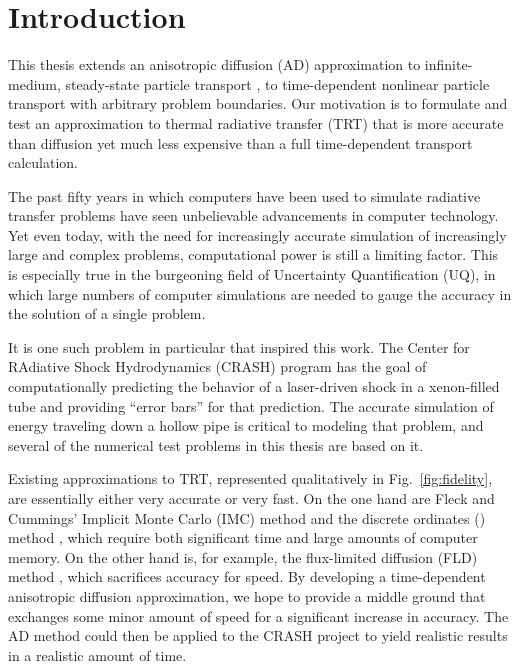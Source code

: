 
\chapter{Introduction}\label{chap:introduction}
This thesis extends an anisotropic diffusion (AD) approximation to
infinite-medium, steady-state particle transport \cite{Mor2007,Lar2009c}, to
time-dependent nonlinear particle transport with arbitrary problem boundaries.
Our motivation is to formulate and test an approximation to thermal radiative
transfer (TRT) that is more accurate than diffusion yet much less expensive
than a full time-dependent transport calculation.

The past fifty years in which computers have been used to simulate radiative
transfer problems \cite{Cam1964,Cam1969} have seen unbelievable
advancements in computer technology.
Yet even today, with the need for increasingly accurate simulation of
increasingly
large and complex problems, computational power is still a limiting factor.
This is especially true in the burgeoning field of Uncertainty Quantification
(UQ), in which large numbers of computer simulations are needed to gauge the
accuracy in the solution of a single problem.

It is one such problem in particular that inspired this work. The Center for
RAdiative Shock Hydrodynamics (CRASH) program \cite{Crash2010} has the goal of
computationally predicting the behavior of a laser-driven shock in a
xenon-filled tube and providing ``error bars'' for that prediction. The accurate
simulation of energy traveling down a hollow pipe is critical to modeling that
problem, and several of the numerical test problems in this thesis are based
on it.

Existing approximations to TRT, represented qualitatively in
Fig.~\ref{fig:fidelity}, are essentially either very accurate or very fast. On
the one hand are Fleck and Cummings' Implicit Monte Carlo (IMC) method
\cite{Fle1971} and the discrete ordinates (\SN) method \cite{Ada1998a}, which
require both significant time and large amounts of computer memory. On the
other hand is, for example, the flux-limited diffusion (FLD) method
\cite{Ols2000}, which sacrifices accuracy for speed. By developing a
time-dependent anisotropic diffusion approximation, we hope to provide a middle
ground that exchanges some minor amount of speed for a significant increase in
accuracy. The AD method could then be applied to the CRASH project to yield
realistic results in a realistic amount of time.

